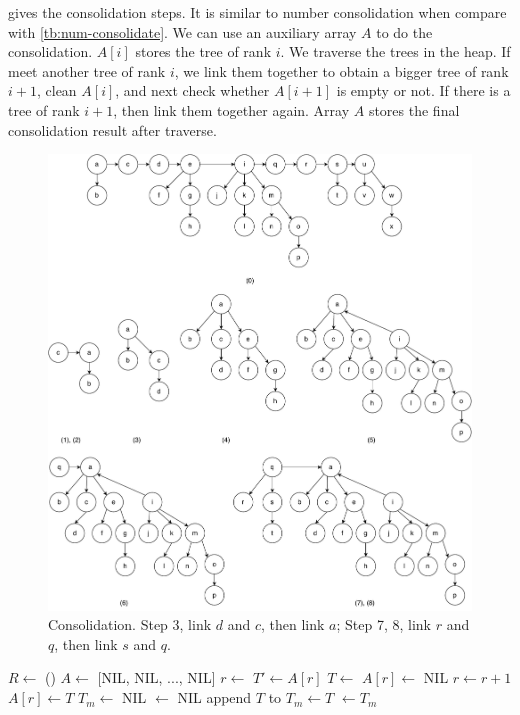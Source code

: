 \documentclass[b5paper]{article}
\begin{document}
 gives the consolidation steps. It is similar to number consolidation when compare with \cref{tb:num-consolidate}. We can use an auxiliary array $A$ to do the consolidation. $A[i]$ stores the tree of rank $i$. We traverse the trees in the heap. If meet another tree of rank $i$, we link them together to obtain a bigger tree of rank $i+1$, clean $A[i]$, and next check whether $A[i + 1]$ is empty or not. If there is a tree of rank $i + 1$, then link them together again. Array $A$ stores the final consolidation result after traverse.

\captionsetup[subfigure]{labelformat=empty, margin=10pt}
\begin{figure}[htbp]
  \centering
  \includegraphics[scale=0.45]{img/fib-meld}
  \caption{Consolidation. Step 3, link $d$ and $c$, then link $a$; Step 7, 8, link $r$ and $q$, then link $s$ and $q$.}
  \label{fig:fib-meld-b}
\end{figure}
\captionsetup[subfigure]{labelformat=parens}

\begin{algorithmic}[1]
  \State $R \gets $ ()
  \State $A \gets$ [NIL, NIL, ..., NIL] 
    \State $r \gets $ 
      \State $T' \gets A[r]$
      \State $T \gets $ 
      \State $A[r] \gets$ NIL
      \State $r \gets r + 1$
    \EndWhile
    \State $A[r] \gets T$
  \EndFor
  \State $T_m \gets$ NIL
  \State {} $\gets$ NIL
      \State append $T$ to 
        \State $T_m \gets T$
      \EndIf
    \EndIf
  \EndFor
  \State {} $\gets T_m$
\EndFunction
\end{algorithmic}
\end{document}
